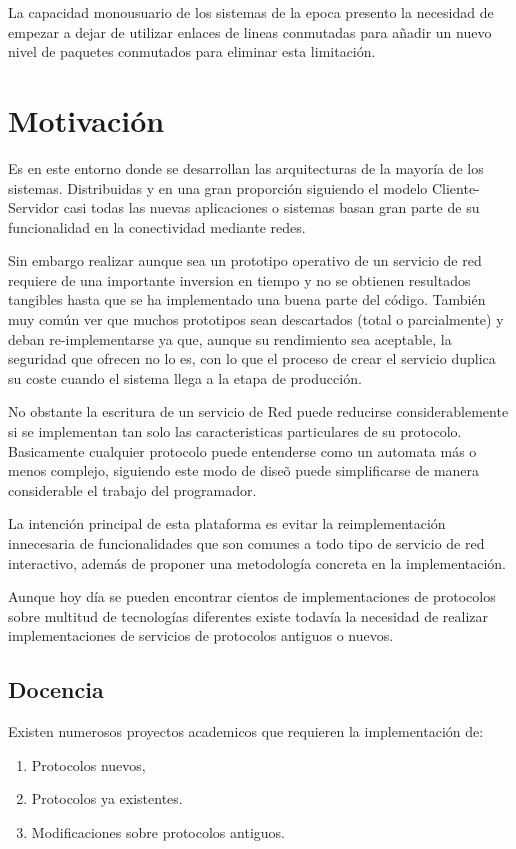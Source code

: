 \documentclass[a4paper,spanish,12pt]{book}
\begin{document}
La capacidad monousuario de los sistemas de la epoca presento la necesidad de empezar a dejar de utilizar enlaces de lineas conmutadas para añadir un nuevo nivel de paquetes conmutados para eliminar esta limitación.

\section{Motivación}

Es en este entorno donde se desarrollan las arquitecturas de la mayor\'ia de los sistemas. Distribuidas y en una gran proporci\'on siguiendo el modelo Cliente-Servidor casi todas las nuevas aplicaciones o sistemas basan gran parte de su funcionalidad en la conectividad mediante redes. 

Sin embargo realizar aunque sea un prototipo operativo de un servicio de red requiere de una importante inversion en tiempo y no se obtienen resultados tangibles hasta que se ha implementado una buena parte del código.
Tambi\'en muy com\'un ver que muchos prototipos sean descartados (total o parcialmente) y deban re-implementarse ya que, aunque su rendimiento sea aceptable, la seguridad que ofrecen no lo es, con lo que el proceso de crear el servicio duplica su coste cuando el sistema llega a la etapa de producci\'on.

No obstante la escritura de un servicio de Red puede reducirse considerablemente si se implementan tan solo las caracteristicas particulares de su protocolo. Basicamente cualquier protocolo puede entenderse como un automata m\'as o menos complejo, siguiendo este modo de dise\~{o} puede simplificarse de manera considerable el trabajo del programador.

La intención principal de esta plataforma es evitar la reimplementación innecesaria de funcionalidades que son comunes a todo tipo de servicio de red interactivo, además de proponer una metodología concreta en la implementación.

Aunque hoy día se pueden encontrar cientos de implementaciones de protocolos sobre multitud de tecnologías diferentes existe todavía la necesidad de realizar implementaciones de servicios de protocolos antiguos o nuevos.

\subsection{Docencia}
Existen numerosos proyectos academicos que requieren la implementaci\'on de:
\begin{enumerate}
	\item Protocolos nuevos,
	\item Protocolos ya existentes.
	\item Modificaciones sobre protocolos antiguos. 
\end{enumerate}
\end{document}
